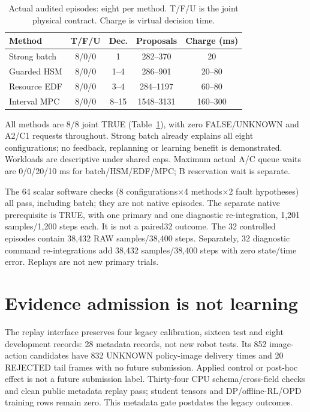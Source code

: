 \documentclass{article}
\begin{document}
\begin{table}[h]
\centering
\caption{Actual audited episodes: eight per method. T/F/U is the joint physical contract. Charge is virtual decision time.}
\label{tab:actual}
\small
\begin{tabular}{@{}lcccc@{}}
\toprule
Method & T/F/U & Dec. & Proposals & Charge (ms) \\
\midrule
Strong batch & 8/0/0 & 1 & 282--370 & 20 \\
Guarded HSM & 8/0/0 & 1--4 & 286--901 & 20--80 \\
Resource EDF & 8/0/0 & 3--4 & 284--1197 & 60--80 \\
Interval MPC & 8/0/0 & 8--15 & 1548--3131 & 160--300 \\
\bottomrule
\end{tabular}
\end{table}
All methods are 8/8 joint TRUE (Table~\ref{tab:actual}), with zero FALSE/UNKNOWN and A2/C1 requests throughout. Strong batch already explains all eight configurations; no feedback, replanning or learning benefit is demonstrated. Workloads are descriptive under shared caps. Maximum actual A/C queue waits are 0/0/20/10 ms for batch/HSM/EDF/MPC; B reservation wait is separate.

The 64 scalar software checks (8 configurations$\times$4 methods$\times$2
fault hypotheses) all pass, including batch; they are not native
episodes. The separate native prerequisite is TRUE, with one primary
and one diagnostic re-integration, 1,201 samples/1,200 steps each.
It is not a paired32 outcome.
The 32 controlled episodes contain 38,432 RAW samples/38,400 steps. Separately, 32 diagnostic command re-integrations add 38,432 samples/38,400 steps with zero state/time error. Replays are not new primary trials.

\section{Evidence admission is not learning}
The replay interface preserves four legacy calibration, sixteen test
and eight development records: 28 metadata records, not new robot tests.
Its 852 image-action candidates have 832 UNKNOWN policy-image delivery
times and 20 REJECTED tail frames with no future submission. Applied
control or post-hoc effect is not a future submission label. Thirty-four
CPU schema/cross-field checks and clean public metadata replay pass;
student tensors and DP/offline-RL/OPD training rows remain zero. This
metadata gate postdates the legacy outcomes.
\end{document}
